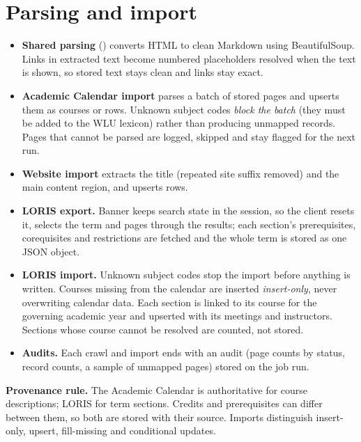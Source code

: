 \documentclass[11pt,letterpaper]{report}
\begin{document}
\section{Parsing and import}
\begin{itemize}
  \item \textbf{Shared parsing} () converts HTML to clean Markdown using
        BeautifulSoup. Links in extracted text become numbered placeholders resolved when the text is
        shown, so stored text stays clean and links stay exact.
  \item \textbf{Academic Calendar import} parses a batch of stored pages and upserts them as courses or
         rows. Unknown subject codes \emph{block the batch} (they must be added to the
        WLU lexicon) rather than producing unmapped records. Pages that cannot be parsed are logged,
        skipped and stay flagged for the next run.
  \item \textbf{Website import} extracts the title (repeated site suffix removed) and the main content
        region, and upserts  rows.
  \item \textbf{LORIS export.} Banner keeps search state in the session, so the client resets it, selects
        the term and pages through the results; each section's prerequisites, corequisites and
        restrictions are fetched and the whole term is stored as one JSON object.
  \item \textbf{LORIS import.} Unknown subject codes stop the import before anything is written. Courses
        missing from the calendar are inserted \emph{insert-only}, never overwriting calendar data. Each
        section is linked to its course for the governing academic year and upserted with its meetings
        and instructors. Sections whose course cannot be resolved are counted, not stored.
  \item \textbf{Audits.} Each crawl and import ends with an audit (page counts by status, record counts,
        a sample of unmapped pages) stored on the job run.
\end{itemize}

\begin{note}
\textbf{Provenance rule.} The Academic Calendar is authoritative for course descriptions; LORIS for
term sections. Credits and prerequisites can differ between them, so both are stored with their
source. Imports distinguish insert-only, upsert, fill-missing and conditional updates.
\end{note}
\end{document}
